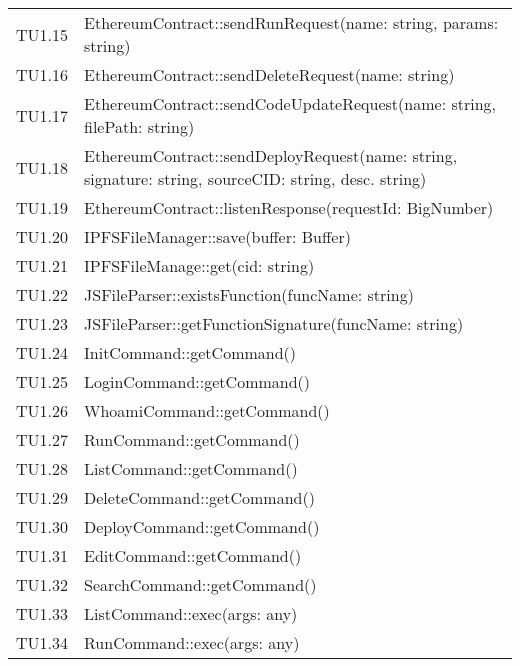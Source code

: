 \begin{longtable}{
		>{\centering}p{}
		>{\centering\arraybackslash}p{}}
	TU1.15 & EthereumContract::sendRunRequest(name: string, params: string) \\

	TU1.16 & EthereumContract::sendDeleteRequest(name: string) \\

	TU1.17 & EthereumContract::sendCodeUpdateRequest(name: string, filePath: string) \\

	TU1.18 & EthereumContract::sendDeployRequest(name: string, signature: string, sourceCID: string, desc. string) \\

	TU1.19 & EthereumContract::listenResponse(requestId: BigNumber) \\

	TU1.20 & IPFSFileManager::save(buffer: Buffer) \\

	TU1.21 & IPFSFileManage::get(cid: string) \\

	TU1.22 & JSFileParser::existsFunction(funcName: string) \\

	TU1.23 & JSFileParser::getFunctionSignature(funcName: string) \\

	TU1.24 & InitCommand::getCommand() \\

	TU1.25 & LoginCommand::getCommand() \\

	TU1.26 & WhoamiCommand::getCommand() \\
	
	TU1.27 & RunCommand::getCommand() \\

	TU1.28 & ListCommand::getCommand() \\
	
	TU1.29 & DeleteCommand::getCommand() \\

	TU1.30 & DeployCommand::getCommand() \\
	
	TU1.31 & EditCommand::getCommand() \\

	TU1.32 & SearchCommand::getCommand() \\
	
	TU1.33 & ListCommand::exec(args: any) \\

	TU1.34 & RunCommand::exec(args: any) \\
	

\end{longtable}
